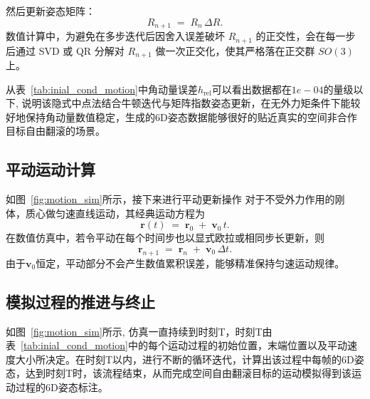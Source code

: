 然后更新姿态矩阵：
\begin{equation}
	R_{n+1}
	\;=\;
	R_{n}\,\Delta R.
\end{equation}
数值计算中，为避免在多步迭代后因舍入误差破坏 $R_{n+1}$ 的正交性，会在每一步后通过 SVD 或 QR 分解对 $R_{n+1}$ 做一次正交化，使其严格落在正交群 $SO(3)$ 上。

从表~\ref{tab:inial_cond_motion}中角动量误差$h_{\mathrm{rel}}$可以看出数据都在$1e-04$的量级以下, 说明该隐式中点法结合牛顿迭代与矩阵指数姿态更新，在无外力矩条件下能较好地保持角动量数值稳定，生成的6D姿态数据能够很好的贴近真实的空间非合作目标自由翻滚的场景。



\subsection{平动运动计算}

如图~\ref{fig:motion_sim}所示，接下来进行平动更新操作
对于不受外力作用的刚体，质心做匀速直线运动，其经典运动方程为
\begin{equation}\label{eq:translation}
	\mathbf{r}(t) \;=\;
	\mathbf{r}_{0}
	\;+\;
	\mathbf{v}_{0}\,t.
\end{equation}
在数值仿真中，若令平动在每个时间步也以显式欧拉或相同步长更新，则
\begin{equation}
\mathbf{r}_{n+1} 
\;=\;
\mathbf{r}_{n} 
\;+\;
\mathbf{v}_{0}\,\Delta t.
\end{equation}
由于$\mathbf{v}_0$恒定，平动部分不会产生数值累积误差，能够精准保持匀速运动规律。

\subsection{模拟过程的推进与终止}
如图~\ref{fig:motion_sim}所示, 仿真一直持续到时刻T，时刻T由表~\ref{tab:inial_cond_motion}中的每个运动过程的初始位置，末端位置以及平动速度大小所决定。在时刻T以内，进行不断的循环迭代，计算出该过程中每帧的6D姿态，达到时刻T时，该流程结束，从而完成空间自由翻滚目标的运动模拟得到该运动过程的6D姿态标注。

